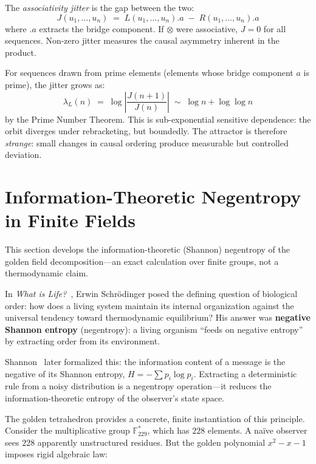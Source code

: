 The \emph{associativity jitter} is the gap between the two:
\[
J(u_1, \ldots, u_n) \;=\; L(u_1, \ldots, u_n).a \;-\; R(u_1, \ldots, u_n).a
\]
where $.a$ extracts the bridge component. If $\otimes$ were
associative, $J = 0$ for all sequences. Non-zero jitter
measures the causal asymmetry inherent in the product.

For sequences drawn from prime elements (elements whose
bridge component $a$ is prime), the jitter grows as:
\[
\lambda_L(n) \;=\; \log\!\left|\frac{J(n+1)}{J(n)}\right|
\;\sim\; \log n + \log\log n
\]
by the Prime Number Theorem. This is sub-exponential sensitive
dependence: the orbit diverges under rebracketing, but
boundedly. The attractor is therefore \emph{strange}: small
changes in causal ordering produce measurable but controlled
deviation.

\section{Information-Theoretic Negentropy in Finite Fields}
\label{sec:negentropy}

This section develops the information-theoretic (Shannon) negentropy of the golden field decomposition---an exact calculation over finite groups, not a thermodynamic claim.

In \emph{What is Life?}~\cite{schrodinger44}, Erwin Schr\"odinger posed
the defining question of biological order: how does a living system
maintain its internal organization against the universal tendency
toward thermodynamic equilibrium? His answer was \textbf{negative
Shannon entropy} (negentropy): a living organism ``feeds on negative entropy''
by extracting order from its environment.

Shannon~\cite{shannon48} later formalized this: the information content
of a message is the negative of its Shannon entropy,
$H = -\sum p_i \log p_i$. Extracting a deterministic rule from a
noisy distribution is a negentropy operation---it reduces the
information-theoretic entropy of the observer's state space.

The golden tetrahedron provides a concrete, finite instantiation
of this principle. Consider the multiplicative group
$\mathbb{F}_{229}^*$, which has $228$ elements. A na\"ive observer
sees $228$ apparently unstructured residues. But the golden
polynomial $x^2 - x - 1$ imposes rigid algebraic law:

